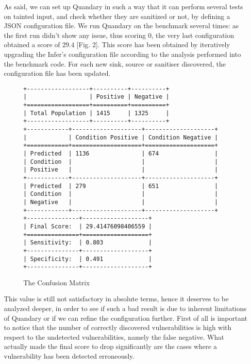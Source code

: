 \documentclass[../Report.tex]{subfiles}
\begin{document}
As said, we can set up Quandary in such a way that it can perform several tests on tainted input, and check whether they are sanitized or not, by defining a JSON configuration file. We run Quandary on the benchmark several times: as the first run didn't show any issue, thus scoring 0, the very last configuration obtained a score of $29.4$ [Fig. 2]. 
This score has been obtained by iteratively upgrading the Infer's configuration file according to the analysis performed into the benchmark code. For each new sink, source or sanitiser discovered, the configuration file has been updated.\\


\begin{figure}
		\small{
			\begin{verbatim}
+------------------+----------+----------+
|                  | Positive | Negative |
+==================+==========+==========+
| Total Population | 1415     | 1325     |
+------------------+----------+----------+
+------------+--------------------+--------------------+
|            | Condition Positive | Condition Negative |
+============+====================+====================+
| Predicted  | 1136               | 674                |
| Condition  |                    |                    |
| Positive   |                    |                    |
+------------+--------------------+--------------------+
| Predicted  | 279                | 651                |
| Condition  |                    |                    |
| Negative   |                    |                    |
+------------+--------------------+--------------------+
+---------------+-------------------+
| Final Score:  | 29.41476098406559 |
+===============+===================+
| Sensitivity:  | 0.803             |
+---------------+-------------------+
| Specificity:  | 0.491             |
+---------------+-------------------+
			\end{verbatim}
		}
	\label{img:confusionmatrix}
	\caption{The Confusion Matrix}
\end{figure}

This value is still not satisfactory in absolute terms, hence it deserves to be analyzed deeper, in order to see if such a bad result is due to inherent limitations of Quandary or if we can refine the configuration further. First of all is important to notice that the number of correctly discovered vulnerabilities is high with respect to the undetected vulnerabilities, namely the false negative. What actually made the final score to drop significantly are the cases where a vulnerability has been detected erroneously.\\
\end{document}
